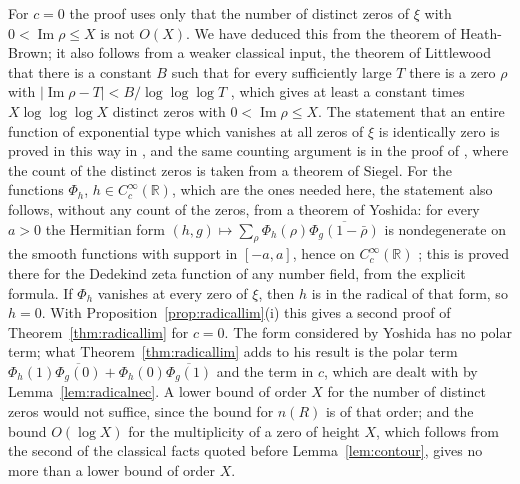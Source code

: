 \documentclass[11pt]{amsart}
\theoremstyle{remark}
\numberwithin{equation}{section}
\newcommand{\R}{\mathbb R}
\newcommand{\Iml}{\operatorname{Im}}
\begin{document}
For $c=0$ the proof uses only that the number of distinct zeros of $\xi$
with $0<\Iml\rho\le X$ is not $O(X)$.  We have deduced this from the theorem
of Heath-Brown; it also follows from a weaker classical input, the theorem
of Littlewood that there is a constant $B$ such that for every sufficiently
large $T$ there is a zero $\rho$ with $|\Iml\rho-T|<B/\log\log\log T$
\cite[Theorem~9.12]{TitchmarshZeta}, which gives at least a constant times
$X\log\log\log X$ distinct zeros with $0<\Iml\rho\le X$.  The statement that
an entire function of exponential type which vanishes at all zeros of $\xi$
is identically zero is proved in this way in \cite[Lemma~2.1]{Suzuki}, and
the same counting argument is in the proof of \cite[Theorem~2]{Yoshida},
where the count of the distinct zeros is taken from a theorem of Siegel.
For the functions $\Phi_h$, $h\in C_c^\infty(\R)$, which are the ones needed
here, the statement also follows, without any count of the zeros, from a
theorem of Yoshida: for every $a>0$ the Hermitian form
$(h,g)\mapsto\sum_\rho\Phi_h(\rho)\overline{\Phi_g(1-\bar\rho)}$ is
nondegenerate on the smooth functions with support in $[-a,a]$, hence on
$C_c^\infty(\R)$ \cite[Proposition~2 and its Corollary]{Yoshida}; this is
proved there for the Dedekind zeta function of any number field, from the
explicit formula.  If $\Phi_h$ vanishes at every zero of $\xi$, then $h$ is
in the radical of that form, so $h=0$.  With
Proposition~\ref{prop:radicallim}(i) this gives a second proof of
Theorem~\ref{thm:radicallim} for $c=0$.  The form considered by Yoshida has
no polar term; what Theorem~\ref{thm:radicallim} adds to his result is the
polar term $\Phi_h(1)\overline{\Phi_g(0)}+\Phi_h(0)\overline{\Phi_g(1)}$ and
the term in $c$, which are dealt with by Lemma~\ref{lem:radicalnec}.  A
lower bound of order $X$
for the number of distinct zeros would not suffice, since the bound for
$n(R)$ is of that order; and the bound $O(\log X)$ for the multiplicity of a
zero of height $X$, which follows from the second of the classical facts
quoted before Lemma~\ref{lem:contour}, gives no more than a lower bound of
order $X$.
\end{document}
